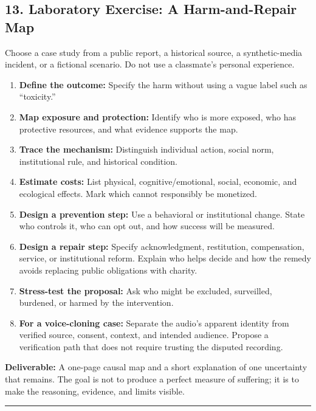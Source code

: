 \documentclass[
  11pt,
  letterpaper,
]{article}
\providecommand{\tightlist}{%
  \setlength{\itemsep}{0pt}\setlength{\parskip}{0pt}}
\begin{document}
\subsection{13. Laboratory Exercise: A Harm-and-Repair
Map}\label{laboratory-exercise-a-harm-and-repair-map}

Choose a case study from a public report, a historical source, a
synthetic-media incident, or a fictional scenario. Do not use a
classmate's personal experience.

\begin{enumerate}
\def\labelenumi{\arabic{enumi}.}
\tightlist
\item
  \textbf{Define the outcome:} Specify the harm without using a vague
  label such as ``toxicity.''
\item
  \textbf{Map exposure and protection:} Identify who is more exposed,
  who has protective resources, and what evidence supports the map.
\item
  \textbf{Trace the mechanism:} Distinguish individual action, social
  norm, institutional rule, and historical condition.
\item
  \textbf{Estimate costs:} List physical, cognitive/emotional, social,
  economic, and ecological effects. Mark which cannot responsibly be
  monetized.
\item
  \textbf{Design a prevention step:} Use a behavioral or institutional
  change. State who controls it, who can opt out, and how success will
  be measured.
\item
  \textbf{Design a repair step:} Specify acknowledgment, restitution,
  compensation, service, or institutional reform. Explain who helps
  decide and how the remedy avoids replacing public obligations with
  charity.
\item
  \textbf{Stress-test the proposal:} Ask who might be excluded,
  surveilled, burdened, or harmed by the intervention.
\item
  \textbf{For a voice-cloning case:} Separate the audio's apparent
  identity from verified source, consent, context, and intended
  audience. Propose a verification path that does not require trusting
  the disputed recording.
\end{enumerate}

\textbf{Deliverable:} A one-page causal map and a short explanation of
one uncertainty that remains. The goal is not to produce a perfect
measure of suffering; it is to make the reasoning, evidence, and limits
visible.

\begin{center}\rule{0.5\linewidth}{0.5pt}\end{center}
\end{document}
